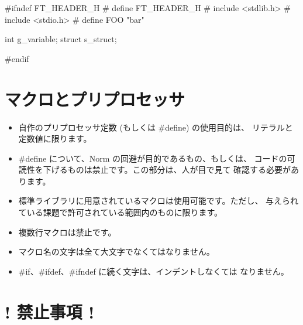 \documentclass{42-ja}
\begin{document}
        \begin{42ccode}
#ifndef FT_HEADER_H
# define FT_HEADER_H
# include <stdlib.h>
# include <stdio.h>
# define FOO "bar"

int g_variable;
struct s_struct;

#endif
        \end{42ccode}
        \newpage

    \section{マクロとプリプロセッサ}

        \begin{itemize}

            \item 自作のプリプロセッサ定数 (もしくは \#define) の使用目的は、
				リテラルと定数値に限ります。
            \item \#define について、Norm の回避が目的であるもの、もしくは、
				コードの可読性を下げるものは禁止です。この部分は、人が目で見て
				確認する必要があります。
            \item 標準ライブラリに用意されているマクロは使用可能です。ただし、
				与えられている課題で許可されている範囲内のものに限ります。
            \item 複数行マクロは禁止です。
            \item マクロ名の文字は全て大文字でなくてはなりません。
            \item \#if、\#ifdef、\#ifndef に続く文字は、インデントしなくては
				なりません。
        \end{itemize}
        \newpage


    \section{! 禁止事項 !}
\end{document}
